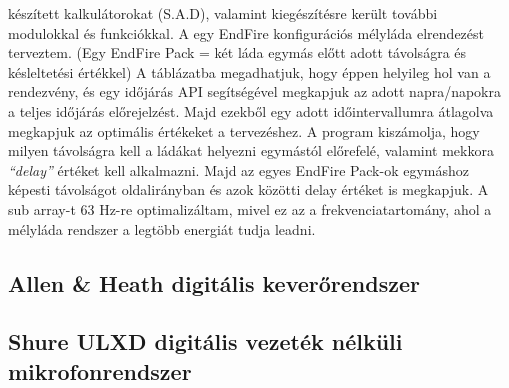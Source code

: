 készített kalkulátorokat (S.A.D), valamint kiegészítésre került további modulokkal és funkciókkal. \cite{MERLINVANVEEN}
A egy EndFire konfigurációs mélyláda elrendezést terveztem. 
(Egy EndFire Pack = két láda egymás előtt adott távolságra és késleltetési értékkel) 
A táblázatba megadhatjuk, hogy éppen helyileg hol
van a rendezvény, és egy időjárás API segítségével megkapjuk az adott napra/napokra a
teljes időjárás előrejelzést. Majd ezekből egy adott időintervallumra átlagolva
megkapjuk az optimális értékeket a tervezéshez. 
A program kiszámolja, hogy milyen távolságra kell a ládákat helyezni egymástól előrefelé,
valamint mekkora \textit{``delay''} értéket kell alkalmazni. 
Majd az egyes EndFire Pack-ok egymáshoz képesti távolságot oldalirányban és azok
közötti delay értéket is megkapjuk. A sub array-t 63 Hz-re optimalizáltam, mivel
ez az a frekvenciatartomány, ahol a mélyláda rendszer a legtöbb energiát tudja leadni.
\subsection{Allen \& Heath digitális keverőrendszer}



\subsection{Shure ULXD digitális vezeték nélküli mikrofonrendszer}



